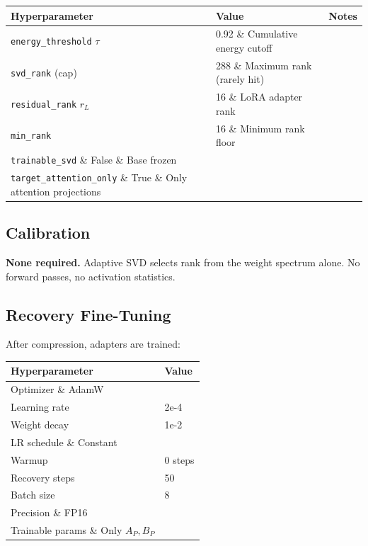 \begin{table}[H]
\centering
\small
\begin{tabular}{lll}
\toprule
\textbf{Hyperparameter} & \textbf{Value} & \textbf{Notes} \\
\midrule
\texttt{energy\_threshold} $\tau$ & 0.92 \& Cumulative energy cutoff \\
\texttt{svd\_rank} (cap) & 288 \& Maximum rank (rarely hit) \\
\texttt{residual\_rank} $r_L$ & 16 \& LoRA adapter rank \\
\texttt{min\_rank} & 16 \& Minimum rank floor \\
\texttt{trainable\_svd} \& False \& Base frozen \\
\texttt{target\_attention\_only} \& True \& Only attention projections \\
\bottomrule
\end{tabular}
\end{table}

\subsection{Calibration}

\textbf{None required.} Adaptive SVD selects rank from the weight spectrum alone. 
No forward passes, no activation statistics.

\subsection{Recovery Fine-Tuning}

After compression, adapters are trained:

\begin{table}[H]
\centering
\small
\begin{tabular}{ll}
\toprule
\textbf{Hyperparameter} & \textbf{Value} \\
\midrule
Optimizer \& AdamW \\
Learning rate & 2e-4 \\
Weight decay & 1e-2 \\
LR schedule \& Constant \\
Warmup & 0 steps \\
Recovery steps & 50 \\
Batch size & 8 \\
Precision \& FP16 \\
Trainable params \& Only $A_P, B_P$ \\
\bottomrule
\end{tabular}
\end{table}

